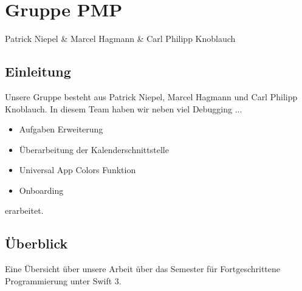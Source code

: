 
\chapter{Gruppe PMP}
Patrick Niepel \& Marcel Hagmann \& Carl Philipp Knoblauch

\section{Einleitung}
Unsere Gruppe besteht aus Patrick Niepel, Marcel Hagmann und Carl Philipp Knoblauch. In diesem Team haben wir neben viel Debugging ...
\begin{itemize}
\item Aufgaben Erweiterung
\item Überarbeitung der Kalenderschnittstelle
\item Universal App Colors Funktion
\item Onboarding
\end{itemize}
erarbeitet.

\section{Überblick}
Eine Übersicht über unsere Arbeit über das Semester für Fortgeschrittene Programmierung unter Swift 3.


